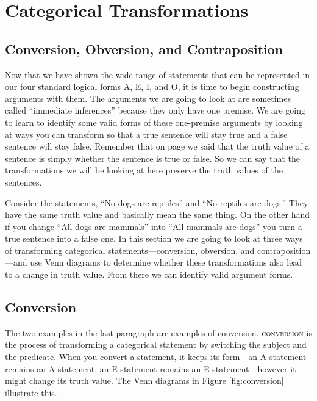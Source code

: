 \chapter{Categorical Transformations}\label{ch:cattransformation}

\section{Conversion, Obversion, and Contraposition}\label{sec:conv_obv_cont}

Now that we have shown the wide range of statements that can be represented in our four standard logical forms A, E, I, and O, it is time to begin constructing arguments with them. The arguments we are going to look at are sometimes called ``immediate inferences'' because they only have one premise. We are going to learn to identify some valid forms of these one-premise arguments by looking at ways you can transform so that a true sentence will stay true and a false sentence will stay false. Remember that on page \pageref{def:truth_value} we said that the \gls{truth value} of a sentence is simply whether the sentence is true or false. So we can say that the transformations we will be looking at here preserve the truth values of the sentences.

Consider the statements, ``No dogs are reptiles'' and ``No reptiles are dogs.'' They have the same truth value and basically mean the same thing. On the other hand if you change ``All dogs are mammals'' into ``All mammals are dogs'' you turn a true sentence into a false one. In this section we are going to look at three ways of transforming categorical statements---conversion, obversion, and contraposition---and use Venn diagrams to determine whether these transformations also lead to a change in truth value. From there we can identify valid argument forms.

\section{Conversion}\label{sec:conversion}

The two examples in the last paragraph are examples of conversion. \textsc{\gls{conversion}} \label{def:conversion} is the process of transforming a categorical statement by switching the subject and the predicate. When you convert a statement, it keeps its form---an A statement remains an A statement, an E statement remains an E statement---however it might change its truth value.  The Venn diagrams in Figure \ref{fig:conversion} illustrate this.

